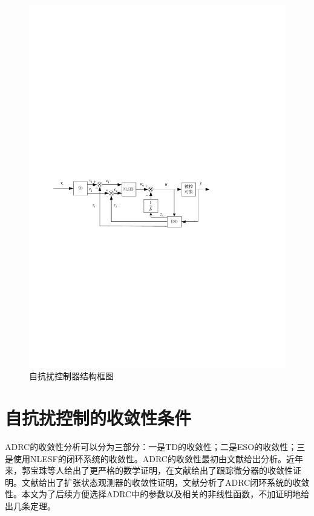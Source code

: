 \begin{figure}[htbp]
	\centering	
	\includegraphics[scale=1]{Fig/Fig_ADRC.pdf}
	\caption{\label{fig_ADRC}自抗扰控制器结构框图}
\end{figure}
\section{自抗扰控制的收敛性条件}
ADRC的收敛性分析可以分为三部分：一是TD的收敛性；二是ESO的收敛性；三是使用NLESF的闭环系统的收敛性。ADRC的收敛性最初由文献\parencite{HanJingQing_2008}给出分析。近年来，郭宝珠等人给出了更严格的数学证明，在文献\parencite{Guo_2010,Guo_2011b,Guo_2011c,Guo_2011d}给出了跟踪微分器的收敛性证明。文献\parencite{Guo_2011,Guo_2011a,Guo_2012,Zhao_2016e}给出了扩张状态观测器的收敛性证明，文献\parencite{Guo_2013,Zhao_2016a,Guo_2013,Guo_2012a}分析了ADRC闭环系统的收敛性。本文为了后续方便选择ADRC中的参数以及相关的非线性函数，不加证明地给出几条定理。
